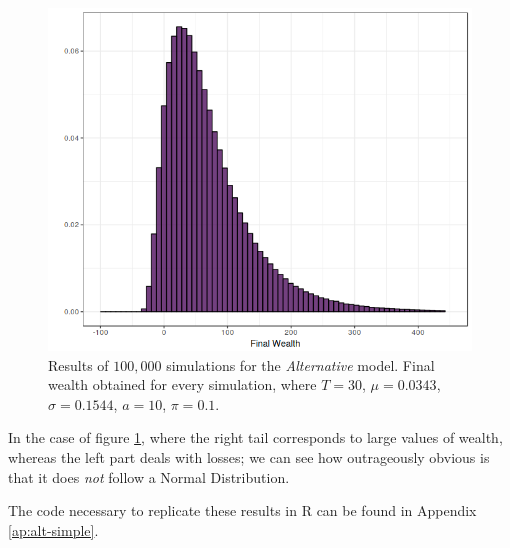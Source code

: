 \begin{figure}[H]
    \centering
    \includegraphics[scale=0.65]{./images/fw_alt.png}
    \caption{Results of $100,000$ simulations for the \textit{Alternative} model. Final wealth obtained for every simulation, where $T=30$, $\mu = 0.0343$, $\sigma = 0.1544$, $a=10$, $\pi = 0.1$.}
    \label{fig:alt_fw}
\end{figure}

In the case of figure \ref{fig:alt_fw}, where the right tail corresponds to large values of wealth, whereas the left part deals with losses; we can see how outrageously obvious is that it does \textit{not} follow a Normal Distribution.

The code necessary to replicate these results in R can be found in Appendix \ref{ap:alt-simple}.
